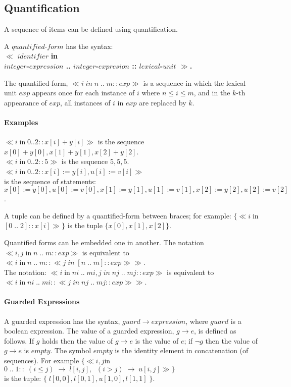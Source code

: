 \subsection{Quantification}
A sequence of items can be defined using quantification.

A $quantified$-$form$ has the syntax:\\
$\ll$ $identifier$ \bf in \rm \\
  $integer$-$expression$ .. $integer$-$expresion$  ::
$lexical$-$unit$ $\gg$.

The quantified-form,
 $ \ll i\; in \; n \; .. \;  m :: exp \gg$ 
is a sequence
in which the lexical unit $exp$ 
appears once for each instance of $i$ where $n \leq i \leq m$, 
and in the $k$-th appearance of $exp$, 
all instances of $i$ in $exp$ are replaced by $k$.
\paragraph{Examples}

$ \ll i \; $in$ \; 0 .. 2  :: x[i]+y[i] \gg  $ is the sequence \\
 $x[0]+y[0], x[1]+y[1], x[2]+y[2]$.\\
$ \ll i \; $in$ \; 0 .. 2  :: 5 \gg $ is the sequence $5,5,5$.\\
$ \ll i \; $in$ \; 0 .. 2  :: x[i] := y[i], u[i] := v[i] \gg $ \\
is the sequence of statements: \\
$ x[0] := y[0],  u[0] := v[0], x[1] := y[1], u[1] := v[1], 
x[2] := y[2], u[2] := v[2]$.


A tuple can be defined by a quantified-form between braces; for
example:
$\{ \ll i \; $in$ [0 \; .. \; 2] :: x[i] \gg \}$
is the tuple
$\{x[0],x[1],x[2]\}$.

Quantified forms can be embedded one in another.
The notation \\
$  \ll i,j \; $in$ \; n \; .. \; m :: exp \gg$ is equivalent to \\
$\ll i \; $in$ \; n \; .. \; m :: \ll j \; in \; [n \; .. \; m] :: exp \gg \gg$.
\\ 
The notation:
$  \ll i \; $in$ \; ni \; .. \; mi , 
j \; in \; nj \; .. \; mj :: exp \gg$ is equivalent to \\
$\ll i \; $in$ \; ni \; .. \; mi :: \ll j \; in \; nj \; .. \; mj :: 
exp \gg \gg$.

\paragraph{Guarded Expressions}
A guarded expression has the syntax, $guard \rightarrow expression$, where
$guard$ is a boolean expression.
The value of a guarded expression, $g \rightarrow e$, is defined as follows.
If $g$ holds then the value of $g \rightarrow e$ is the value of $e$; 
if $\neg g$ then the value of $g \rightarrow e$ is $empty$.
The symbol $empty$ is the identity element in concatenation (of sequences).
For example $\{ \ll i,j $in$ 0\; ..\; 1 :: \;(i  \leq j)\; \rightarrow\; l[i,j],
\;\;(i > j)\; \rightarrow \;u[i,j] \gg \}$\\
 is the tuple:
$\{\; l[0,0],l[0,1],u[1,0],l[1,1]\; \}$.

